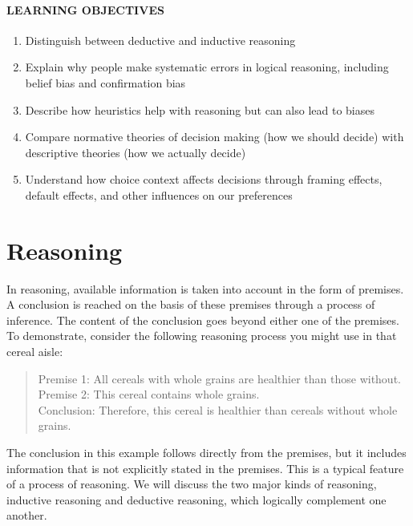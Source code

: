 \documentclass[
]{krantz}
\providecommand{\tightlist}{%
  \setlength{\itemsep}{0pt}\setlength{\parskip}{0pt}}
\begin{document}
\paragraph*{LEARNING OBJECTIVES}\label{learning-objectives-8}

\begin{enumerate}
\def\labelenumi{\arabic{enumi}.}
\tightlist
\item
  Distinguish between deductive and inductive reasoning
\item
  Explain why people make systematic errors in logical reasoning, including belief bias and confirmation bias
\item
  Describe how heuristics help with reasoning but can also lead to biases
\item
  Compare normative theories of decision making (how we should decide) with descriptive theories (how we actually decide)
\item
  Understand how choice context affects decisions through framing effects, default effects, and other influences on our preferences
\end{enumerate}

\section{Reasoning}\label{reasoning}

In reasoning, available information is taken into account in the form of premises. A conclusion is reached on the basis of these premises through a process of inference. The content of the conclusion goes beyond either one of the premises. To demonstrate, consider the following reasoning process you might use in that cereal aisle:

\begin{quote}
Premise 1: All cereals with whole grains are healthier than those without.\\
Premise 2: This cereal contains whole grains.\\
Conclusion: Therefore, this cereal is healthier than cereals without whole grains.
\end{quote}

The conclusion in this example follows directly from the premises, but it includes information that is not explicitly stated in the premises. This is a typical feature of a process of reasoning. We will discuss the two major kinds of reasoning, inductive reasoning and deductive reasoning, which logically complement one another.
\end{document}
